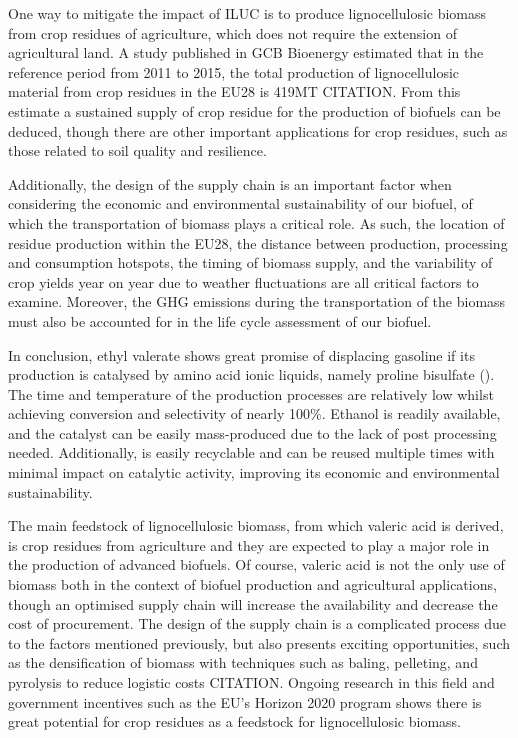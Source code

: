 \documentclass[11pt]{article}
\begin{document}
One way to mitigate the impact of ILUC is to produce lignocellulosic biomass from crop residues of agriculture, which does not require the extension of agricultural land. A study published in GCB Bioenergy estimated that in the reference period from 2011 to 2015, the total production of lignocellulosic material from crop residues in the EU28 is 419MT CITATION. From this estimate a sustained supply of crop residue for the production of biofuels can be deduced, though there are other important applications for crop residues, such as those related to soil quality and resilience.  

Additionally, the design of the supply chain is an important factor when considering the economic and environmental sustainability of our biofuel, of which the transportation of biomass plays a critical role. As such, the location of residue production within the EU28, the distance between production, processing and consumption hotspots, the timing of biomass supply, and the variability of crop yields year on year due to weather fluctuations are all critical factors to examine. Moreover, the GHG emissions during the transportation of the biomass must also be accounted for in the life cycle assessment of our biofuel.

In conclusion, ethyl valerate shows great promise of displacing gasoline if its production is catalysed by amino acid ionic liquids, namely proline bisulfate (). The time and temperature of the production processes are relatively low whilst achieving conversion and selectivity of nearly 100\%. Ethanol is readily available, and the catalyst can be easily mass-produced due to the lack of post processing needed. Additionally,  is easily recyclable and can be reused multiple times with minimal impact on catalytic activity, improving its economic and environmental sustainability.

The main feedstock of lignocellulosic biomass, from which valeric acid is derived, is crop residues from agriculture and they are expected to play a major role in the production of advanced biofuels. Of course, valeric acid is not the only use of biomass both in the context of biofuel production and agricultural applications, though an optimised supply chain will increase the availability and decrease the cost of procurement. The design of the supply chain is a complicated process due to the factors mentioned previously, but also presents exciting opportunities, such as the densification of biomass with techniques such as baling, pelleting, and pyrolysis to reduce logistic costs CITATION. Ongoing research in this field and government incentives such as the EU’s Horizon 2020 program shows there is great potential for crop residues as a feedstock for lignocellulosic biomass.
   
\end{document}
